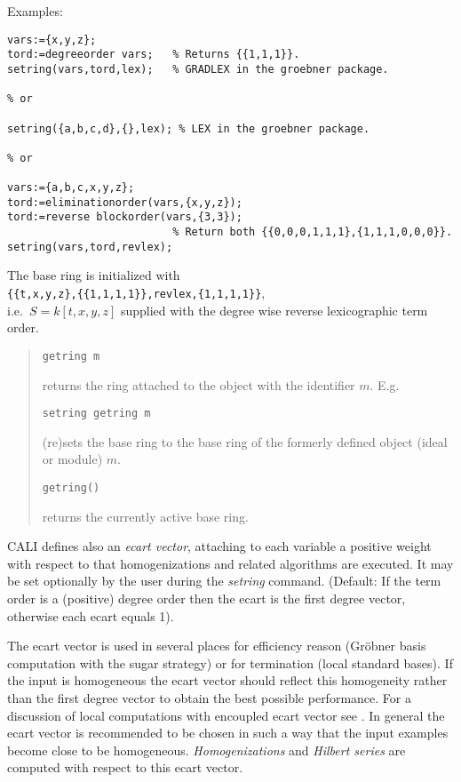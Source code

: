 \documentclass[a4paper,11pt]{article}
\newcommand{\gr}{Gr\"obner}
\newcommand{\ind}[1]{{\em #1}\index{#1}}
\newcommand{\pbx}[1]{\mbox{}\hfill \parbox[t]{12cm}{#1} \pagebreak[3]}
\begin{document}
\noindent Examples:
\begin{verbatim}
vars:={x,y,z};
tord:=degreeorder vars;   % Returns {{1,1,1}}.
setring(vars,tord,lex);   % GRADLEX in the groebner package.

% or

setring({a,b,c,d},{},lex); % LEX in the groebner package.

% or

vars:={a,b,c,x,y,z};
tord:=eliminationorder(vars,{x,y,z});
tord:=reverse blockorder(vars,{3,3});
                          % Return both {{0,0,0,1,1,1},{1,1,1,0,0,0}}.
setring(vars,tord,revlex);                          
\end{verbatim}
\pagebreak[2]

The base ring is initialized with \\[10pt]
\verb|{{t,x,y,z},{{1,1,1,1}},revlex,{1,1,1,1}}|,\\[10pt]
i.e.\ $S=k[t,x,y,z]$ supplied with the degree wise reverse
lexicographic term order.
\begin{quote}
\verb|getring m| 

\pbx{returns the ring attached to the object with the identifier
$m$. E.g.\ }  

\verb|setring getring m|

\pbx{(re)sets the base ring to the base ring of the formerly defined
object (ideal or module) $m$.}

\verb|getring()|

\pbx{returns the currently active base ring.}
\end{quote}

CALI defines also an \ind{ecart vector}, attaching to each variable a
positive weight with respect to that homogenizations and related
algorithms are executed. It may be set optionally by the user during
the \ind{setring} command.  (Default: If the term order is a
(positive) degree order then the ecart is the first degree vector,
otherwise each ecart equals 1).

The ecart vector is used in several places for efficiency reason ({\gr}
basis computation with the sugar strategy) or for termination (local
standard bases). If the input is homogeneous the ecart vector should
reflect this homogeneity rather than the first degree vector to
obtain the best possible performance. For a discussion of local
computations with encoupled ecart vector see \cite{tcah}. In general
the ecart vector is recommended to be chosen in such a way that the
input examples become close to be homogeneous. {\em Homogenizations}
and \ind{Hilbert series} are computed with respect to this ecart
vector.
\medskip
\end{document}
